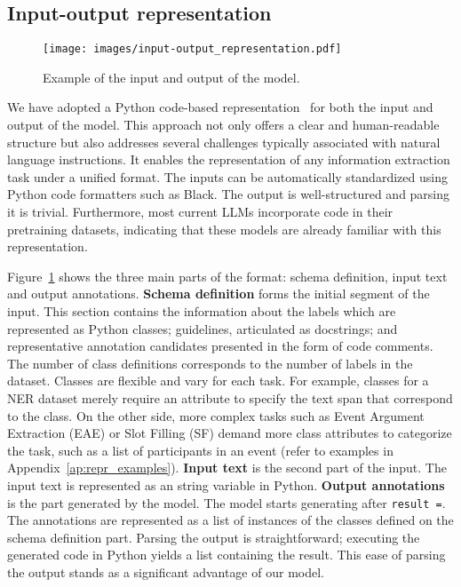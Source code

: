 \documentclass{article} \usepackage{iclr2024_conference,times}
\begin{document}
\subsection{Input-output representation}

\begin{figure}
    \centering
    \texttt{[image: images/input-output\_representation.pdf]}
    \caption{Example of the input and output of the model.}
    \label{fig:input-output}
\end{figure}

We have adopted a Python code-based representation~\citep{wang-etal-2023-code4struct, li-etal-2023-codeie} for both the input and output of the model. This approach not only offers a clear and human-readable structure but also addresses several challenges typically associated with natural language instructions. It enables the representation of any information extraction task under a unified format. The inputs can be automatically standardized using Python code formatters such as Black. The output is well-structured and parsing it is trivial. Furthermore, most current LLMs incorporate code in their pretraining datasets, indicating that these models are already familiar with this representation.

Figure~\ref{fig:input-output} shows the three main parts of the format: schema definition, input text and output annotations. \textbf{Schema definition} forms the initial segment of the input. This section contains the information about the labels which are represented as Python classes; guidelines, articulated as docstrings; and representative annotation candidates presented in the form of code comments. The number of class definitions corresponds to the number of labels in the dataset. Classes are flexible and vary for each task. For example, classes for a NER dataset merely require an attribute to specify the text span that correspond to the class. On the other side, more complex tasks such as Event Argument Extraction (EAE) or Slot Filling (SF) demand more class attributes to categorize the task, such as a list of participants in an event (refer to examples in Appendix~\ref{ap:repr_examples}). \textbf{Input text} is the second part of the input. The input text is represented as an string variable in Python. \textbf{Output annotations} is the part generated by the model. The model starts generating after \texttt{result =}. The annotations are represented as a list of instances of the classes defined on the schema definition part. Parsing the output is straightforward; executing the generated code in Python yields a list containing the result. This ease of parsing the output stands as a significant advantage of our model.
\end{document}
